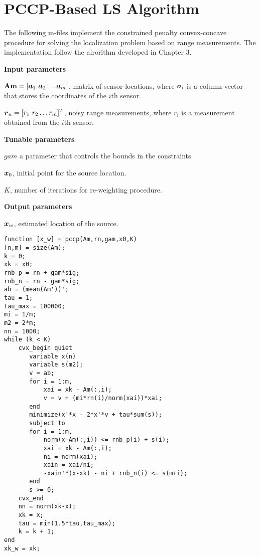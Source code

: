 \section{PCCP-Based LS Algorithm}

The following m-files implement the constrained penalty convex-concave procedure for solving the localization problem based on range measurements. The implementation follow the alrorithm developed in Chapter 3.

\phantom{m}

\noindent
\textbf{Input parameters}

\noindent
$\mbox{\textbf{Am}} = [\mbox{\boldmath$a$}_1 \ \mbox{\boldmath$a$}_2 \ldots \mbox{\boldmath$a$}_m]$, matrix of sensor locations, where $\mbox{\boldmath$a$}_i$ is a column vector that stores the coordinates of the $i$th sensor.

\noindent
$\mbox{\boldmath$r$}_n = [r_1 \ r_2 \ldots r_m]^T$, noisy range measurements, where $r_i$ is a measurement obtained from the $i$th sensor.

\noindent
\textbf{Tunable parameters}

\noindent
$gam$ a parameter that controls the bounds in the constraints.

\noindent
$\mbox{\boldmath$x$}_0$, initial point for the source location.

\noindent
$K$, number of iterations for re-weighting procedure.

\noindent
\textbf{Output parameters}

\noindent
$\mbox{\boldmath$x$}_w$, estimated location of the source.

\phantom{m}

\begin{lstlisting}
function [x_w] = pccp(Am,rn,gam,x0,K)
[n,m] = size(Am);
k = 0;
xk = x0;
rnb_p = rn + gam*sig;
rnb_n = rn - gam*sig;
ab = (mean(Am'))';
tau = 1;
tau_max = 100000;
mi = 1/m;
m2 = 2*m;
nn = 1000;
while (k < K) 
    cvx_begin quiet
       variable x(n)
       variable s(m2);
       v = ab;
       for i = 1:m,
           xai = xk - Am(:,i);
           v = v + (mi*rn(i)/norm(xai))*xai;
       end
       minimize(x'*x - 2*x'*v + tau*sum(s));
       subject to
       for i = 1:m,
           norm(x-Am(:,i)) <= rnb_p(i) + s(i);
           xai = xk - Am(:,i);
           ni = norm(xai);
           xain = xai/ni;
           -xain'*(x-xk) - ni + rnb_n(i) <= s(m+i);
       end
       s >= 0;
    cvx_end
    nn = norm(xk-x);
    xk = x;
    tau = min(1.5*tau,tau_max);
    k = k + 1;
end
xk_w = xk;
\end{lstlisting}

\newpage

